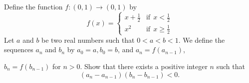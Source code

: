 Define the function 
$f:(0,1)\to (0,1)$
 by 
\[\displaystyle f(x) = \left\{ \begin{array}{lr} x+\frac 12 & \text{if}\ \  x < \frac 12\\ x^2 & \text{if}\ \  x \ge \frac 12 \end{array} \right.\]
 Let 
$a$
 and 
$b$
 be two real numbers such that 
$0 < a < b < 1$.
 We define the sequences 
$a_n$
 and 
$b_n$
 by 
$a_0 = a, b_0 = b$, 
 and 
$a_n = f( a_{n -1})$, 
 
$b_n = f (b_{n -1} )$
 for 
$n > 0$.
 Show that there exists a positive integer 
$n$
 such that 
\[(a_n - a_{n-1})(b_n-b_{n-1})<0.\]


